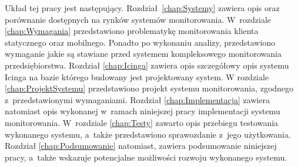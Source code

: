 Układ tej pracy jest następujący. Rozdział~\ref{chap:Systemy} zawiera
opis oraz porównanie dostępnych na rynków systemów
monitorowania. W~rozdziale \ref{chap:Wymagania} przedstawiono
problematykę monitorowania klienta statycznego oraz mobilnego. Ponadto
po wykonaniu analizy, przedstawiono wymaganie jakie są stawiane przed
systemem kompleksowego monitorowania przedsiębiorstwa. Rozdział
\ref{chap:Icinga} zawiera opis szczegółowy opis systemu Icinga na
bazie którego budowany jest projektowany system. W rozdziale
\ref{chap:ProjektSystemu} przedstawiono projekt systemu monitorowania,
zgodnego z~przedstawionymi wymaganiami. Rozdział
\ref{chap:Implementacja} zawiera natomiast opis wykonanej w~ramach
niniejszej pracy implementacji systemu monitorowania. W~rozdziale
\ref{chap:Testy} zawarto opis przebiegu testowania wykonanego systemu,
a~także przedstawiono sprawozdanie z~jego użytkowania. Rozdział
\ref{chap:Podsumowanie} natomiast, zawiera podsumowanie niniejszej
pracy, a~także wskazuje potencjalne możliwości rozwoju wykonanego
systemu.
